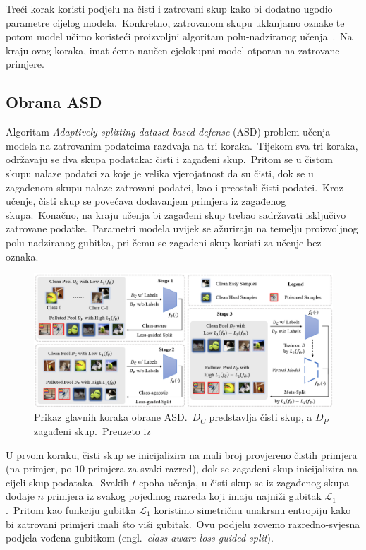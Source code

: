 \documentclass[diplomskirad]{fer}
\begin{document}
Treći korak koristi podjelu na čisti i zatrovani skup kako bi dodatno ugodio parametre cijelog modela.\ 
Konkretno, zatrovanom skupu uklanjamo oznake te potom model učimo koristeći proizvoljni algoritam polu-nadziranog učenja~\cite{van2020survey}.\ 
Na kraju ovog koraka, imat ćemo naučen cjelokupni model otporan na zatrovane primjere.\ 

\pagebreak

\subsection{Obrana ASD}
\label{sub:asd}

Algoritam \textit{Adaptively splitting dataset-based defense} (ASD) problem učenja modela na zatrovanim podatcima razdvaja na tri koraka.\ 
Tijekom sva tri koraka, održavaju se dva skupa podataka: čisti i zagađeni skup.\ Pritom se u čistom skupu nalaze podatci za koje je velika vjerojatnost da su čisti, dok se u zagađenom skupu nalaze zatrovani podatci, kao i preostali čisti podatci.\ 
Kroz učenje, čisti skup se povećava dodavanjem primjera iz zagađenog skupa.\ Konačno, na kraju učenja bi zagađeni skup trebao sadržavati isključivo zatrovane podatke.\ 
Parametri modela uvijek se ažuriraju na temelju proizvoljnog polu-nadziranog gubitka, pri čemu se zagađeni skup koristi za učenje bez oznaka.\   

\begin{figure}[h]
  \centering
  \includegraphics[scale=0.65]{./Slike/asd.png}
  \caption{Prikaz glavnih koraka obrane ASD.\ $D_C$ predstavlja čisti skup, a $D_P$ zagađeni skup.\ Preuzeto iz\cite{gao2023backdoor}}
  \label{fig:asd}
\end{figure}
  
U prvom koraku, čisti skup se inicijalizira na mali broj provjereno čistih primjera (na primjer, po $10$ primjera za svaki razred), dok se zagađeni skup inicijalizira na cijeli skup podataka.\ 
Svakih $t$ epoha učenja, u čisti skup se iz zagađenog skupa dodaje $n$ primjera iz svakog pojedinog razreda koji imaju najniži gubitak $\mathcal{L}_1$.\ Pritom kao funkciju gubitka $\mathcal{L}_1$ koristimo simetričnu unakrsnu entropiju kako bi zatrovani primjeri imali što viši gubitak.\ 
Ovu podjelu zovemo razredno-svjesna podjela vođena gubitkom (engl.\ \textit{class-aware loss-guided split}).\ 
  
\end{document}
